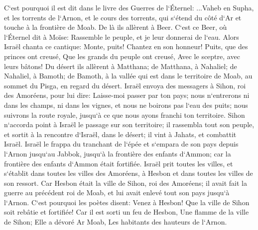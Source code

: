 \verse C`est pourquoi il est dit dans le livre des Guerres de l`Éternel: ...Vaheb en Supha, et les torrents de l`Arnon, 
\verse et le cours des torrents, qui s`étend du côté d`Ar et touche à la frontière de Moab. 
\verse De là ils allèrent à Beer. C`est ce Beer, où l`Éternel dit à Moïse: Rassemble le peuple, et je leur donnerai de l`eau. 
\verse Alors Israël chanta ce cantique: Monte, puits! Chantez en son honneur! 
\verse Puits, que des princes ont creusé, Que les grands du peuple ont creusé, Avec le sceptre, avec leurs bâtons! 
\verse Du désert ils allèrent à Matthana; de Matthana, à Nahaliel; de Nahaliel, à Bamoth; 
\verse de Bamoth, à la vallée qui est dans le territoire de Moab, au sommet du Pisga, en regard du désert. 
\verse Israël envoya des messagers à Sihon, roi des Amoréens, pour lui dire: 
\verse Laisse-moi passer par ton pays; nous n`entrerons ni dans les champs, ni dans les vignes, et nous ne boirons pas l`eau des puits; nous suivrons la route royale, jusqu`à ce que nous ayons franchi ton territoire. 
\verse Sihon n`accorda point à Israël le passage sur son territoire; il rassembla tout son peuple, et sortit à la rencontre d`Israël, dans le désert; il vint à Jahats, et combattit Israël. 
\verse Israël le frappa du tranchant de l`épée et s`empara de son pays depuis l`Arnon jusqu`au Jabbok, jusqu`à la frontière des enfants d`Ammon; car la frontière des enfants d`Ammon était fortifiée. 
\verse Israël prit toutes les villes, et s`établit dans toutes les villes des Amoréens, à Hesbon et dans toutes les villes de son ressort. 
\verse Car Hesbon était la ville de Sihon, roi des Amoréens; il avait fait la guerre au précédent roi de Moab, et lui avait enlevé tout son pays jusqu`à l`Arnon. 
\verse C`est pourquoi les poètes disent: Venez à Hesbon! Que la ville de Sihon soit rebâtie et fortifiée! 
\verse Car il est sorti un feu de Hesbon, Une flamme de la ville de Sihon; Elle a dévoré Ar Moab, Les habitants des hauteurs de l`Arnon. 
